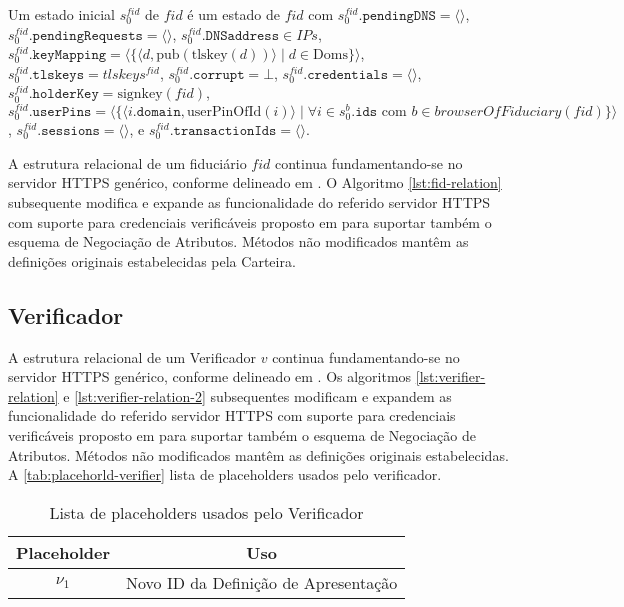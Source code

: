Um estado inicial $s^{fid}_0$ de $fid$ é um estado de $fid$ com $s^{fid}_0.\texttt{pendingDNS} = \langle \rangle$, $s^{fid}_0.\texttt{pendingRequests} = \langle \rangle$,
$s^{fid}_0.\texttt{DNSaddress} \in IPs$, $s^{fid}_0.\texttt{keyMapping} = \langle \{ \langle d, \text{pub}(\text{tlskey}(d)) \rangle \mid d \in \text{Doms} \} \rangle$,
$s^{fid}_0.\texttt{tlskeys} = tlskeys^{fid}$, $s^{fid}_0.\texttt{corrupt} = \bot$, $s^{fid}_0.\texttt{credentials} = \langle \rangle$,
$s^{fid}_0.\texttt{holderKey} = \text{signkey}(fid)$, $s^{fid}_0.\texttt{userPins} = \langle \{ \langle i.\texttt{domain}, \text{userPinOfId}(i) \rangle \mid \forall i \in s^b_0.\texttt{ids} \text{ com } b \in browserOfFiduciary(fid) \} \rangle$,
$s^{fid}_0.\texttt{sessions} = \langle \rangle$, e $s^{fid}_0.\texttt{transactionIds} = \langle \rangle$.

A estrutura relacional de um fiduciário $fid$  continua fundamentando-se no servidor HTTPS genérico, conforme delineado em \cite{FettKS14}. O Algoritmo \ref{lst:fid-relation} subsequente modifica e expande as funcionalidade do referido servidor HTTPS com suporte para  credenciais verificáveis proposto em \cite{hauck2023openid} para suportar também o esquema de Negociação de Atributos. Métodos não modificados mantêm as definições originais estabelecidas pela Carteira.



%
\subsection{Verificador}

A estrutura relacional de um Verificador $v$  continua fundamentando-se no servidor HTTPS genérico, conforme delineado em \cite{FettKS14}. Os algoritmos \ref{lst:verifier-relation} e \ref{lst:verifier-relation-2} subsequentes modificam e expandem as funcionalidade do referido servidor HTTPS com suporte para credenciais verificáveis proposto em \cite{hauck2023openid} para suportar também o esquema de Negociação de Atributos. Métodos não modificados mantêm as definições originais estabelecidas. A \autoref{tab:placehorld-verifier} lista de placeholders usados pelo verificador.

\begin{table}[h]
    \centering
    \begin{tabular}{cc}
        \hline
        Placeholder & Uso \\ 
        \hline
        $\nu_1$ & Novo ID da Definição de Apresentação \\
        \hline
    \end{tabular}
    \caption{Lista de placeholders usados pelo Verificador}
    \label{tab:placehorld-verifier}
\end{table}


